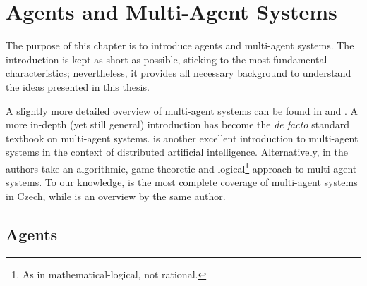
\chapter{Agents and Multi-Agent Systems}

The purpose of this chapter is to introduce agents and multi-agent systems.
The introduction is kept as short as possible, sticking to the most fundamental characteristics; nevertheless, it provides all necessary background to understand the ideas presented in this thesis.

A slightly more detailed overview of multi-agent systems can be found in \cite{Wooldridge02} and \cite{Wooldridge95}. A more in-depth (yet still general) introduction \cite{Wooldridge09} has become the \textit{de facto} standard textbook on multi-agent systems.
\cite{Weiss99} is another excellent introduction to multi-agent systems in the context of distributed artificial intelligence.
Alternatively, in \cite{Shoham08} the authors take an algorithmic, game-theoretic and logical\footnote{As in mathematical-logical, not rational.} approach to multi-agent systems.
To our knowledge, \cite{Kubik04} is the most complete coverage of multi-agent systems in Czech, while \cite{Kubik03} is an overview by the same author.

\section{Agents}

